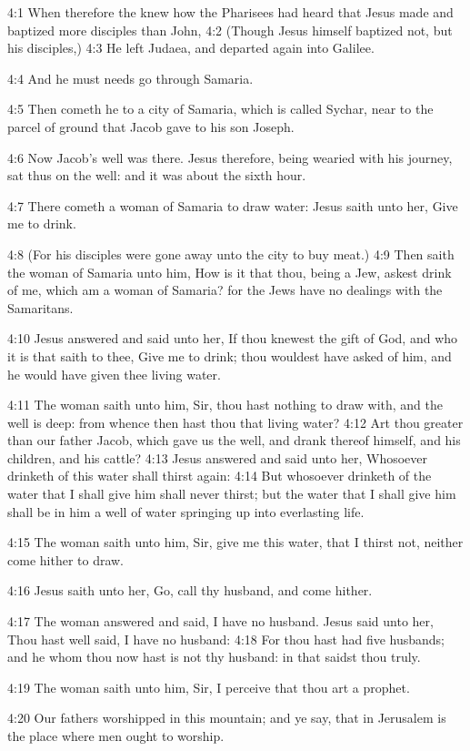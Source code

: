 4:1 When therefore the \LORD knew how the Pharisees had heard that Jesus made and baptized more disciples than John, 4:2 (Though Jesus himself baptized not, but his disciples,) 4:3 He left Judaea, and departed again into Galilee.

4:4 And he must needs go through Samaria.

4:5 Then cometh he to a city of Samaria, which is called Sychar, near to the parcel of ground that Jacob gave to his son Joseph.

4:6 Now Jacob's well was there. Jesus therefore, being wearied with his journey, sat thus on the well: and it was about the sixth hour.

4:7 There cometh a woman of Samaria to draw water: Jesus saith unto her, Give me to drink.

4:8 (For his disciples were gone away unto the city to buy meat.)  4:9 Then saith the woman of Samaria unto him, How is it that thou, being a Jew, askest drink of me, which am a woman of Samaria? for the Jews have no dealings with the Samaritans.

4:10 Jesus answered and said unto her, If thou knewest the gift of God, and who it is that saith to thee, Give me to drink; thou wouldest have asked of him, and he would have given thee living water.

4:11 The woman saith unto him, Sir, thou hast nothing to draw with, and the well is deep: from whence then hast thou that living water?  4:12 Art thou greater than our father Jacob, which gave us the well, and drank thereof himself, and his children, and his cattle?  4:13 Jesus answered and said unto her, Whosoever drinketh of this water shall thirst again: 4:14 But whosoever drinketh of the water that I shall give him shall never thirst; but the water that I shall give him shall be in him a well of water springing up into everlasting life.

4:15 The woman saith unto him, Sir, give me this water, that I thirst not, neither come hither to draw.

4:16 Jesus saith unto her, Go, call thy husband, and come hither.

4:17 The woman answered and said, I have no husband. Jesus said unto her, Thou hast well said, I have no husband: 4:18 For thou hast had five husbands; and he whom thou now hast is not thy husband: in that saidst thou truly.

4:19 The woman saith unto him, Sir, I perceive that thou art a prophet.

4:20 Our fathers worshipped in this mountain; and ye say, that in Jerusalem is the place where men ought to worship.

